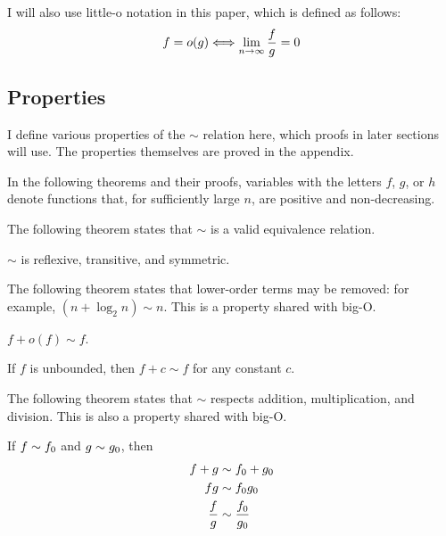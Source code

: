 I will also use little-o notation in this paper, which is defined as follows:
\begin{align*}
f = o(g) \Longleftrightarrow \lim_{n \to \infty} \frac{f}{g} = 0
\end{align*}
\subsection{Properties}
\label{subsec:AsymptoticProperties}

I define various properties of the $\sim$ relation here, which proofs in later sections will use. The properties themselves are proved in the appendix.

{\HdrNote} In the following theorems and their proofs, variables with the letters $f$, $g$, or $h$ denote functions that, for sufficiently large $n$, are positive and non-decreasing.

The following theorem states that $\sim$ is a valid equivalence relation.

\begin{theorem}
\label{thm:EquivalenceRelation}
	$\sim$ is reflexive, transitive, and symmetric.
\end{theorem}

The following theorem states that lower-order terms may be removed: for example, $(n + \log_2 n) \sim n$. This is a property shared with big-O.

\begin{theorem}
\label{thm:RemovesLowerOrderTerms}
	$f + o(f) \sim f$.
\end{theorem}

\begin{corollary}
\label{coro:PlusConstant}
	If $f$ is unbounded, then $f + c \sim f$ for any constant $c$.
\end{corollary}

The following theorem states that $\sim$ respects addition, multiplication, and division. This is also a property shared with big-O.

\begin{theorem}
\label{thm:MergesOverOps}
	If $f \sim f_0$ and $g \sim g_0$, then
	\begin{align*}
	f + g &\sim f_0 + g_0\\
	fg &\sim f_0g_0\\
	\frac{f}{g} &\sim \frac {f_0} {g_0}
	\end{align*}
\end{theorem}

